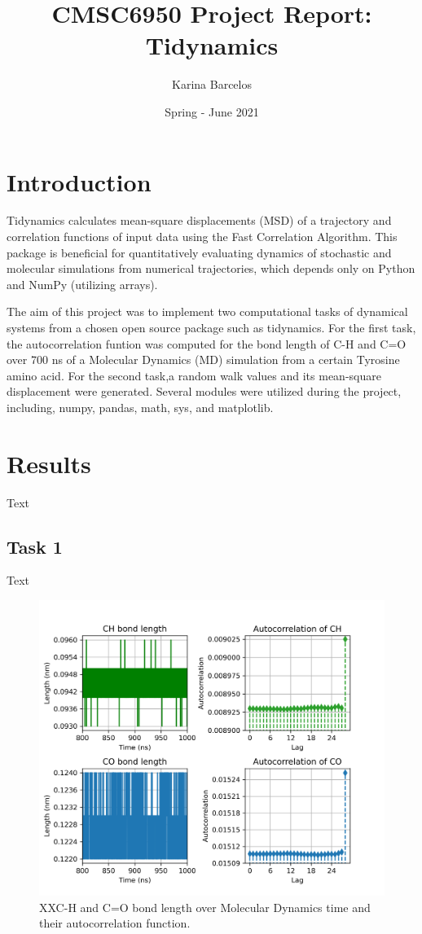 \documentclass{article}
\title{CMSC6950 Project Report: Tidynamics}
\author{Karina Barcelos}
\date{Spring - June 2021}
\begin{document}
\maketitle

\section{Introduction}

Tidynamics \cite{Buyl2018} calculates mean-square displacements (MSD) of a trajectory and correlation functions of input data using the Fast Correlation Algorithm. This package is beneficial for quantitatively evaluating dynamics of stochastic and molecular simulations from numerical trajectories, which depends only on Python and NumPy (utilizing arrays). 

The aim of this project was to implement two computational tasks of dynamical systems from a chosen open source package such as tidynamics\cite{Buyl2018}. For the first task, the autocorrelation funtion was computed for the bond length of C-H and C=O over 700 ns of a Molecular Dynamics (MD) simulation from a certain Tyrosine amino acid. For the second task,a random walk values and its mean-square displacement were generated. Several modules were utilized during the project, including, numpy, pandas, math, sys, and matplotlib. 

\section{Results}

Text

\subsection{Task 1}

Text 

\begin{figure}[H]
\includegraphics[width=\linewidth]{CO_CH_length_acf_plot.png}
\caption{XXC-H and C=O bond length over Molecular Dynamics time and their autocorrelation function.}
\label{acf_plot}
\end{figure}
\end{document}
